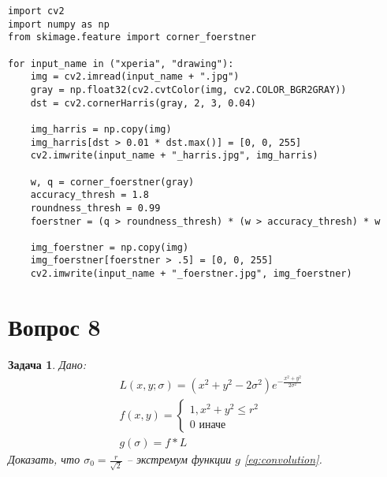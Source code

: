 \documentclass[a4paper,12pt]{article}
\newtheorem{problem}{Задача}
\begin{document}
\begin{lstlisting}
import cv2
import numpy as np
from skimage.feature import corner_foerstner

for input_name in ("xperia", "drawing"):
    img = cv2.imread(input_name + ".jpg")
    gray = np.float32(cv2.cvtColor(img, cv2.COLOR_BGR2GRAY))
    dst = cv2.cornerHarris(gray, 2, 3, 0.04)

    img_harris = np.copy(img)
    img_harris[dst > 0.01 * dst.max()] = [0, 0, 255]
    cv2.imwrite(input_name + "_harris.jpg", img_harris)

    w, q = corner_foerstner(gray)
    accuracy_thresh = 1.8
    roundness_thresh = 0.99
    foerstner = (q > roundness_thresh) * (w > accuracy_thresh) * w

    img_foerstner = np.copy(img)
    img_foerstner[foerstner > .5] = [0, 0, 255]
    cv2.imwrite(input_name + "_foerstner.jpg", img_foerstner)
\end{lstlisting}

\section{Вопрос 8}


\begin{problem}
Дано:
\begin{align}
    \label{eq:laplacian}
    & L(x,y; \sigma) = (x^2 + y^2 - 2 \sigma^2) e^{-\frac{x^2+y^2}{2 \sigma^2}} \\
    \label{eq:f}
    & f(x,y) = \begin{cases}
        1, x^2 + y^2 \le r^2 \\
        0 \text{ иначе}
    \end{cases} \\
   \label{eq:convolution}
   & g(\sigma) = f * L
\end{align}
Доказать, что $ \sigma_0 = \frac{r}{\sqrt 2} $ -- экстремум функции $g$ \eqref{eq:convolution}.
\end{problem}
\end{document}
